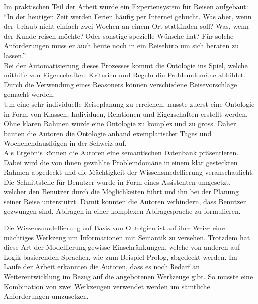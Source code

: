 Im praktischen Teil der Arbeit wurde ein Expertensystem für Reisen aufgebaut: ``In der heutigen Zeit werden Ferien häufig per Internet gebucht. Was aber, wenn der Urlaub nicht einfach zwei Wochen an einem Ort stattfinden soll? Was, wenn der Kunde reisen möchte? Oder sonstige spezielle Wünsche hat? Für solche Anforderungen muss er auch heute noch in ein Reisebüro um sich beraten zu lassen.''\\
Bei der Automatisierung dieses Prozesses kommt die Ontologie ins Spiel, welche mithilfe von Eigenschaften, Kriterien und Regeln die Problemdomäne abbildet. Durch die Verwendung eines Reasoners können verschiedene Reisevorschläge gemacht werden.\\
Um eine sehr individuelle Reiseplanung zu erreichen, musste zuerst eine Ontologie in Form von Klassen, Individuen, Relationen und Eigenschaften erstellt werden. Ohne klaren Rahmen würde eine Ontologie zu komplex und zu gross. Daher bauten die Autoren die Ontologie anhand exemplarischer Tages und Wochenendausflügen in der Schweiz auf.\\
Als Ergebnis können die Autoren eine semantischen Datenbank präsentieren. Dabei wird die von ihnen gewählte Problemdomäne in einem klar gesteckten Rahmen abgedeckt und die Mächtigkeit der Wissensmodellierung veranschaulicht. Die Schnittstelle für Benutzer wurde in Form eines Assistenten umgesetzt, welcher den Benutzer durch die Möglichkeiten führt und ihn bei der Planung seiner Reise unterstützt. Damit konnten die Autoren verhindern, dass Benutzer gezwungen sind, Abfragen in einer komplexen Abfragesprache zu formulieren.

Die Wissensmodellierung auf Basis von Ontolgien ist auf ihre Weise eine mächtiges Werkzeug um Informationen mit Semantik zu versehen. Trotzdem hat diese Art der Modellierung gewisse Einschränkungen, welche von anderen auf Logik basierenden Sprachen, wie zum Beispiel Prolog, abgedeckt werden. Im Laufe der Arbeit erkannten die Autoren, dass es noch Bedarf an Weiterentwicklung im Bezug auf die angebotenen Werkzeuge gibt. So musste eine Kombination von zwei Werkzeugen verwendet werden um sämtliche Anforderungen umzusetzen.


